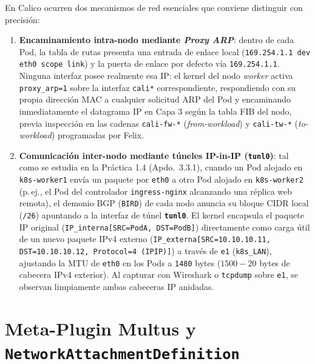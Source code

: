 En Calico ocurren dos mecanismos de red esenciales que conviene distinguir con precisión:
\begin{enumerate}
  \item \textbf{Encaminamiento intra-nodo mediante \textit{Proxy ARP}}: dentro de cada Pod, la tabla de rutas presenta una entrada de enlace local (\texttt{169.254.1.1 dev eth0 scope link}) y la puerta de enlace por defecto vía \texttt{169.254.1.1}. Ninguna interfaz posee realmente esa IP: el kernel del nodo \textit{worker} activa \texttt{proxy\_arp=1} sobre la interfaz \texttt{cali*} correspondiente, respondiendo con su propia dirección MAC a cualquier solicitud ARP del Pod y encaminando inmediatamente el datagrama IP en Capa 3 según la tabla FIB del nodo, previa inspección en las cadenas \texttt{cali-fw-*} (\textit{from-workload}) y \texttt{cali-tw-*} (\textit{to-workload}) programadas por Felix.
  \item \textbf{Comunicación inter-nodo mediante túneles IP-in-IP (\texttt{tunl0})}: tal como se estudia en la Práctica 1.4 (Apdo.~3.3.1), cuando un Pod alojado en \texttt{k8s-worker1} envía un paquete por \texttt{eth0} a otro Pod alojado en \texttt{k8s-worker2} (p.\,ej., el Pod del controlador \texttt{ingress-nginx} alcanzando una réplica web remota), el demonio BGP (\texttt{BIRD}) de cada nodo anuncia su bloque CIDR local (\texttt{/26}) apuntando a la interfaz de túnel \textbf{\texttt{tunl0}}. El kernel encapsula el paquete IP original (\texttt{IP\_interna[SRC=PodA, DST=PodB]}) directamente como carga útil de un nuevo paquete IPv4 externo (\texttt{IP\_externa[SRC=10.10.10.11, DST=10.10.10.12, Protocol=4 (IPIP)]}) a través de \texttt{e1} (\texttt{k8s\_LAN}), ajustando la MTU de \texttt{eth0} en los Pods a \texttt{1480} bytes ($1500 - 20$ bytes de cabecera IPv4 exterior). Al capturar con Wireshark o \texttt{tcpdump} sobre \texttt{e1}, se observan limpiamente ambas cabeceras IP anidadas.
\end{enumerate}

\section{Meta-Plugin Multus y \texttt{NetworkAttachmentDefinition}}

